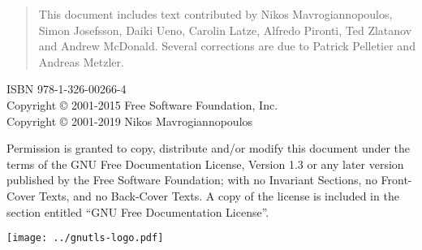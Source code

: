 \thispagestyle{empty}

\begin{quotation}
This document includes text contributed by
Nikos Mavrogiannopoulos, Simon Josefsson, Daiki Ueno, 
Carolin Latze, Alfredo Pironti, Ted Zlatanov and Andrew McDonald. Several corrections are due
to Patrick Pelletier and Andreas Metzler.
\end{quotation}



\begin{flushleft}
ISBN 978-1-326-00266-4\\
Copyright \copyright{} 2001-2015 Free Software Foundation, Inc.\\
Copyright \copyright{} 2001-2019 Nikos Mavrogiannopoulos
\end{flushleft}

\begin{flushleft}
Permission is granted to copy, distribute and/or modify this document
under the terms of the GNU Free Documentation License, Version 1.3 or
any later version published by the Free Software Foundation; with no
Invariant Sections, no Front-Cover Texts, and no Back-Cover Texts.  A
copy of the license is included in the section entitled ``GNU Free
Documentation License''.
\end{flushleft}

\newpage
\thispagestyle{empty}

\begin{center}
\texttt{[image: ../gnutls-logo.pdf]}
\end{center}

